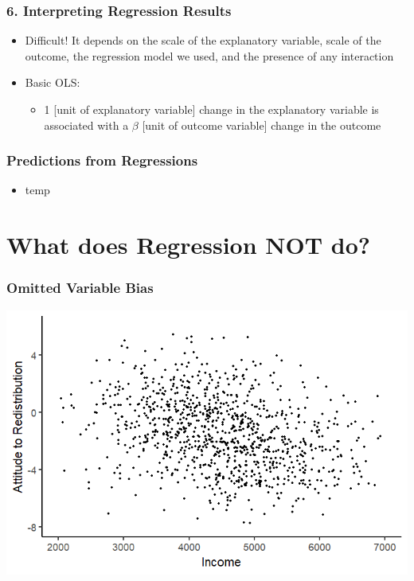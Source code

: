 \documentclass[xcolor=x11names,compress]{beamer}\usepackage[]{graphicx}\usepackage[]{color}
\makeatletter
\def\maxwidth{ %
  \ifdim\Gin@nat@width>\linewidth
    \linewidth
  \else
    \Gin@nat@width
  \fi
}
\newenvironment{knitrout}{}{} %
\renewcommand{\(}{\begin{columns}}
\renewcommand{\)}{\end{columns}}
\newcommand{\<}[1]{\begin{column}{#1}}
\renewcommand{\>}{\end{column}}
\makeatother
\begin{document}
\begin{frame}
\frametitle{6. Interpreting Regression Results}
\begin{itemize}
\item Difficult! It depends on the scale of the explanatory variable, scale of the outcome, the regression model we used, and the presence of any interaction
\item Basic OLS:
\begin{itemize}
\item 1 [unit of explanatory variable] change in the explanatory variable is associated with a $\beta$ [unit of outcome variable] change in the outcome
\end{itemize}
\end{itemize}
\end{frame}

\begin{frame}
\frametitle{Predictions from Regressions}
\begin{itemize}
\item temp
\end{itemize}
\end{frame}


\section{What does Regression NOT do?}



\begin{frame}
\frametitle{Omitted Variable Bias}
\begin{knitrout}
\color{fgcolor}
\includegraphics[width=\maxwidth]{figure/confound3b-1} 

\end{knitrout}
\end{frame}
\end{document}

